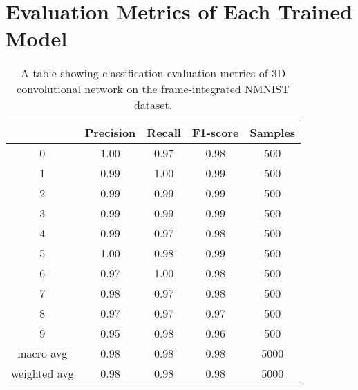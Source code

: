 \chapter{Evaluation Metrics of Each Trained Model}

\begin{table}[htb]
    \centering
    \begin{tabular}{|| c | c | c | c | c ||}
        \hline
             & Precision & Recall & F1-score & Samples \\
        \hline \hline
        0            & 1.00  & 0.97  & 0.98 & 500 \\
        \hline
        1            & 0.99  & 1.00  & 0.99 & 500 \\
        \hline
        2            & 0.99  & 0.99  & 0.99 & 500 \\
        \hline
        3            & 0.99  & 0.99  & 0.99 & 500 \\
        \hline
        4            & 0.99  & 0.97  & 0.98 & 500 \\
        \hline
        5            & 1.00  & 0.98  & 0.99 & 500 \\
        \hline
        6            & 0.97  & 1.00  & 0.98 & 500 \\
        \hline
        7            & 0.98  & 0.97  & 0.98 & 500 \\
        \hline
        8            & 0.97  & 0.97  & 0.97 & 500 \\
        \hline
        9            & 0.95  & 0.98  & 0.96 & 500 \\
        \hline
        macro avg    & 0.98  & 0.98  & 0.98 & 5000 \\
        \hline
        weighted avg & 0.98  & 0.98  & 0.98 & 5000 \\
        \hline
    \end{tabular}
    \caption{A table showing classification evaluation metrics of 3D convolutional network on the frame-integrated NMNIST dataset.}
    \label{tab:conv3d_nmnist_evaluation_metrics}
\end{table}

